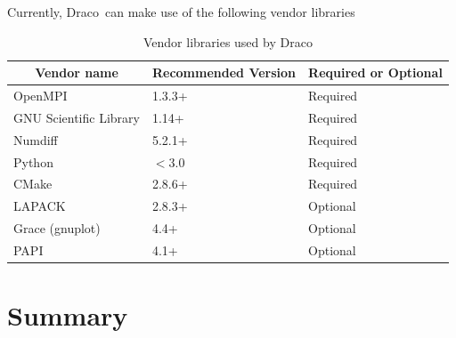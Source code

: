 \documentclass[note]{newmemo}
\newcommand{\draco}{{\normalfont\small\sffamily Draco}}
\begin{document}
Currently, \draco\ can make use of the following vendor libraries
%
\begin{table}[ht]
  \caption{Vendor libraries used by \draco}
  \label{tab:vendors}
\begin{center}
\begin{tabular}{lll} \hline\hline
\multicolumn{1}{c}{Vendor name} & 
\multicolumn{1}{c}{Recommended Version} & 
\multicolumn{1}{c}{Required or Optional} \\ \hline
OpenMPI                & 1.3.3+ & Required \\
GNU Scientific Library & 1.14+  & Required \\
Numdiff                & 5.2.1+ & Required \\
Python                 & $<$3.0 & Required \\
CMake                  & 2.8.6+ & Required \\
LAPACK                 & 2.8.3+ & Optional \\
Grace (gnuplot)        & 4.4+   & Optional \\
PAPI                   & 4.1+   & Optional \\
\hline\hline
\end{tabular}
\end{center}
\end{table}





\section{Summary}
\label{sec:summary}
\end{document}
